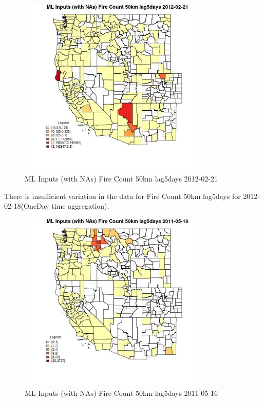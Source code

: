 \begin{figure} 
\centering  
\includegraphics[width=0.77\textwidth]{Code_Outputs/Report_ML_input_PM25_Step4_part_f_de_duplicated_aveswNAs_CountyFire_Count_50km_lag5daysMean2012-02-21.jpg} 
\caption{\label{fig:Report_ML_input_PM25_Step4_part_f_de_duplicated_aveswNAsCountyFire_Count_50km_lag5daysMean2012-02-21}ML Inputs (with NAs) Fire Count 50km lag5days 2012-02-21} 
\end{figure} 
 

There is insufficient variation in the data for Fire Count 50km lag5days for 2012-02-18(OneDay time aggregation). 
 

\begin{figure} 
\centering  
\includegraphics[width=0.77\textwidth]{Code_Outputs/Report_ML_input_PM25_Step4_part_f_de_duplicated_aveswNAs_CountyFire_Count_50km_lag5daysMean2011-05-16.jpg} 
\caption{\label{fig:Report_ML_input_PM25_Step4_part_f_de_duplicated_aveswNAsCountyFire_Count_50km_lag5daysMean2011-05-16}ML Inputs (with NAs) Fire Count 50km lag5days 2011-05-16} 
\end{figure} 
 

